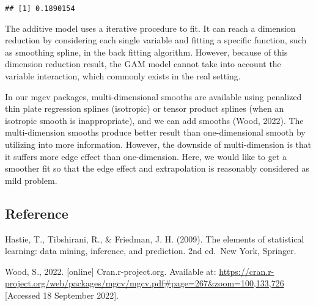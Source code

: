 \documentclass[
]{article}
\newenvironment{Shaded}{\begin{snugshade}}{\end{snugshade}}
\newcommand{\AttributeTok}[1]{\textcolor[rgb]{0.77,0.63,0.00}{#1}}
\newcommand{\DecValTok}[1]{\textcolor[rgb]{0.00,0.00,0.81}{#1}}
\newcommand{\DocumentationTok}[1]{\textcolor[rgb]{0.56,0.35,0.01}{\textbf{\textit{#1}}}}
\newcommand{\FunctionTok}[1]{\textcolor[rgb]{0.00,0.00,0.00}{#1}}
\newcommand{\NormalTok}[1]{#1}
\newcommand{\OtherTok}[1]{\textcolor[rgb]{0.56,0.35,0.01}{#1}}
\newcommand{\SpecialCharTok}[1]{\textcolor[rgb]{0.00,0.00,0.00}{#1}}
\begin{document}
\begin{Shaded}
\end{Shaded}

\begin{verbatim}
## [1] 0.1890154
\end{verbatim}

The additive model uses a iterative procedure to fit. It can reach a
dimension reduction by considering each single variable and fitting a
specific function, such as smoothing spline, in the back fitting
algorithm. However, because of this dimension reduction result, the GAM
model cannot take into account the variable interaction, which commonly
exists in the real setting.

In our mgcv packages, multi-dimensional smooths are available using
penalized thin plate regression splines (isotropic) or tensor product
splines (when an isotropic smooth is inappropriate), and we can add
smooths (Wood, 2022). The multi-dimension smooths produce better result
than one-dimensional smooth by utilizing into more information. However,
the downside of multi-dimension is that it suffers more edge effect than
one-dimension. Here, we would like to get a smoother fit so that the
edge effect and extrapolation is reasonably considered as mild problem.

\hypertarget{reference}{%
\subsection{Reference}\label{reference}}

Hastie, T., Tibshirani, R., \& Friedman, J. H. (2009). The elements of
statistical learning: data mining, inference, and prediction. 2nd
ed.~New York, Springer.

Wood, S., 2022. {[}online{]} Cran.r-project.org. Available at:
\url{https://cran.r-project.org/web/packages/mgcv/mgcv.pdf\#page=267\&zoom=100,133,726}
{[}Accessed 18 September 2022{]}.
\end{document}

